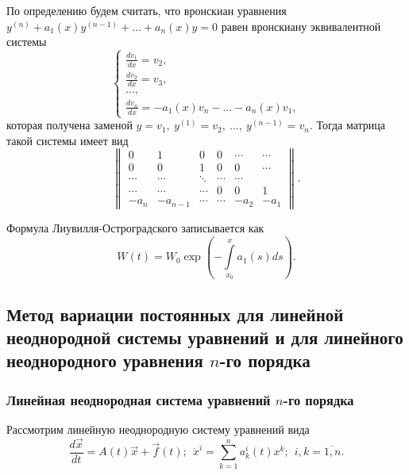 По определению будем считать, что вронскиан уравнения $y^{(n)} + a_1(x) y^{(n - 1)} + \dots + a_n(x)y = 0$ равен вронскиану эквивалентной системы
\begin{equation*}
  \begin{cases}
    \frac{dv_1}{dx} = v_2,
    \\
    \frac{dv_2}{dx} = v_3,
    \\
    ...,
    \\
    \frac{dv_n}{dx} = - a_1(x)v_n - ... - a_n(x)v_1,
  \end{cases}
\end{equation*}
которая получена заменой $y = v_1, ~y^{(1)} = v_2,~..., ~y^{(n-1)} = v_n$. Тогда матрица такой системы имеет вид
\begin{equation*}
  \begin{Vmatrix*} 0 & 1 & 0 & 0 &\cdots & \cdots \\
                    0 & 0 & 1 & 0 & 0 & \cdots      \\
    \cdots & \cdots & \ddots & \cdots & \cdots \\
    \cdots & \cdots & \cdots & 0 & 0 & 1 \\ 
    -a_n & -a_{n-1} & \cdots & \cdots & -a_2 & -a_1
  \end{Vmatrix*}.
\end{equation*}

Формула Лиувилля-Остроградского записывается как
\begin{equation*}
  W(t) = W_0\exp{\left( -\int\limits_{x_0}^{x}a_1(s) ds\right)}.
\end{equation*}

\subsection{Метод вариации постоянных для линейной неоднородной системы уравнений и для линейного неоднородного уравнения $n$-го порядка}

\subsubsection{Линейная неоднородная система уравнений $n$-го порядка}

Рассмотрим линейную неоднородную систему уравнений вида
\begin{equation}
    \frac{d \overrightarrow x}{dt} = A(t) \overrightarrow x + \overrightarrow{f}(t); ~~ \dot x^i = \sum^n_{k = 1} a^i_k(t) x^k; ~~ i, k = \overline{1, n}.
    \label{4_4_var}
\end{equation}

